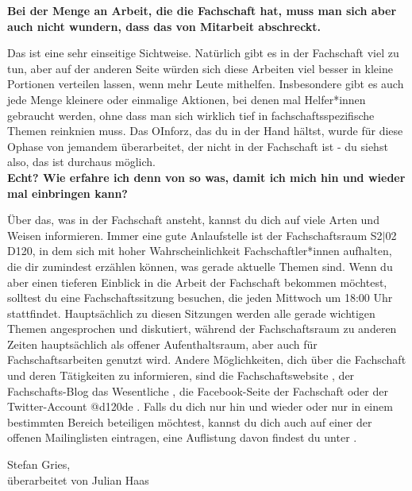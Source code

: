{\textbf{Bei der Menge an Arbeit, die die Fachschaft hat, muss man sich aber auch nicht wundern, dass das von Mitarbeit abschreckt.}

Das ist eine sehr einseitige Sichtweise. Natürlich gibt es in der Fachschaft viel zu tun, aber auf der anderen Seite würden sich diese Arbeiten viel besser in kleine Portionen verteilen lassen, wenn mehr Leute mithelfen. Insbesondere gibt es auch jede Menge kleinere oder einmalige Aktionen, bei denen mal Helfer*innen gebraucht werden, ohne dass man sich wirklich tief in fachschaftsspezifische Themen reinknien muss. Das OInforz, das du in der Hand hältst, wurde für diese Ophase von jemandem überarbeitet, der nicht in der Fachschaft ist - du siehst also, das ist durchaus möglich.\\

\textbf{Echt? Wie erfahre ich denn von so was, damit ich mich hin und wieder mal einbringen kann?}

Über das, was in der Fachschaft ansteht, kannst du dich auf viele Arten und Weisen informieren. Immer eine gute Anlaufstelle ist der Fachschaftsraum S2$|$02 D120, in dem sich mit hoher Wahrscheinlichkeit Fachschaftler*innen aufhalten, die dir zumindest erzählen können, was gerade aktuelle Themen sind. Wenn du aber einen tieferen Einblick in die Arbeit der Fachschaft bekommen möchtest, solltest du eine Fachschaftssitzung besuchen, die jeden Mittwoch um 18:00 Uhr stattfindet. Hauptsächlich zu diesen Sitzungen werden alle gerade wichtigen Themen angesprochen und diskutiert, während der Fachschaftsraum zu anderen Zeiten hauptsächlich als offener Aufenthaltsraum, aber auch für Fachschaftsarbeiten genutzt wird. Andere Möglichkeiten, dich über die Fachschaft und deren Tätigkeiten zu informieren, sind die Fachschaftswebsite \footnotemark[3], der Fachschafts-Blog das Wesentliche \footnotemark[4], die Facebook-Seite der Fachschaft \footnotemark[5] oder der Twitter-Account @d120de \footnotemark[6]. Falls du dich nur hin und wieder oder nur in einem bestimmten Bereich beteiligen möchtest, kannst du dich auch auf einer der offenen Mailinglisten eintragen, eine Auflistung davon findest du unter \footnotemark[7].
}
{Stefan Gries,\\
überarbeitet von Julian Haas}



\newpage
